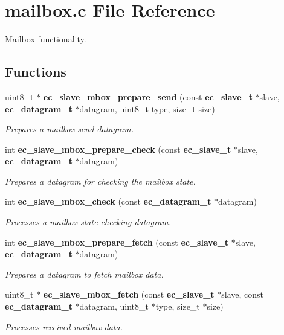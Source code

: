 \section{mailbox.\-c \-File \-Reference}
\label{mailbox_8c}


\-Mailbox functionality.  


\subsection*{\-Functions}
\begin{DoxyCompactItemize}
\item 
uint8\-\_\-t $\ast$ {\bf ec\-\_\-slave\-\_\-mbox\-\_\-prepare\-\_\-send} (const {\bf ec\-\_\-slave\-\_\-t} $\ast$slave, {\bf ec\-\_\-datagram\-\_\-t} $\ast$datagram, uint8\-\_\-t type, size\-\_\-t size)
\begin{DoxyCompactList}\small\item\em \-Prepares a mailbox-\/send datagram. \end{DoxyCompactList}\item 
int {\bf ec\-\_\-slave\-\_\-mbox\-\_\-prepare\-\_\-check} (const {\bf ec\-\_\-slave\-\_\-t} $\ast$slave, {\bf ec\-\_\-datagram\-\_\-t} $\ast$datagram)
\begin{DoxyCompactList}\small\item\em \-Prepares a datagram for checking the mailbox state. \end{DoxyCompactList}\item 
int {\bf ec\-\_\-slave\-\_\-mbox\-\_\-check} (const {\bf ec\-\_\-datagram\-\_\-t} $\ast$datagram)
\begin{DoxyCompactList}\small\item\em \-Processes a mailbox state checking datagram. \end{DoxyCompactList}\item 
int {\bf ec\-\_\-slave\-\_\-mbox\-\_\-prepare\-\_\-fetch} (const {\bf ec\-\_\-slave\-\_\-t} $\ast$slave, {\bf ec\-\_\-datagram\-\_\-t} $\ast$datagram)
\begin{DoxyCompactList}\small\item\em \-Prepares a datagram to fetch mailbox data. \end{DoxyCompactList}\item 
uint8\-\_\-t $\ast$ {\bf ec\-\_\-slave\-\_\-mbox\-\_\-fetch} (const {\bf ec\-\_\-slave\-\_\-t} $\ast$slave, const {\bf ec\-\_\-datagram\-\_\-t} $\ast$datagram, uint8\-\_\-t $\ast$type, size\-\_\-t $\ast$size)
\begin{DoxyCompactList}\small\item\em \-Processes received mailbox data. \end{DoxyCompactList}\end{DoxyCompactItemize}
